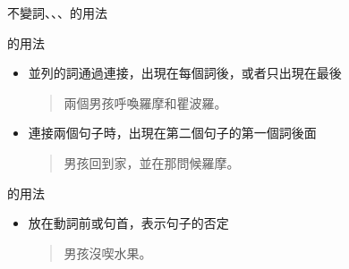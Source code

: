 \documentclass[aspectratio=169]{beamer}
\begin{document}
\begin{frame}{不變詞、、、的用法}
    \begin{block}{的用法}
        \begin{itemize}
            \item 並列的詞通過連接，出現在每個詞後，或者只出現在最後\\
            \begin{quotation}
                \rmfamily
                 兩個男孩呼喚羅摩和瞿波羅。
            \end{quotation}
            \item 連接兩個句子時，出現在第二個句子的第一個詞後面\\
            \begin{quotation}
                \rmfamily
                 男孩回到家，並在那問候羅摩。
            \end{quotation}
        \end{itemize}
    \end{block}

    \begin{block}{的用法}
        \begin{itemize}
            \item {}放在動詞前或句首，表示句子的否定\\
            \begin{quotation}
                \rmfamily
                 男孩沒喫水果。
            \end{quotation}
        \end{itemize}
    \end{block}
\end{frame}
\end{document}
